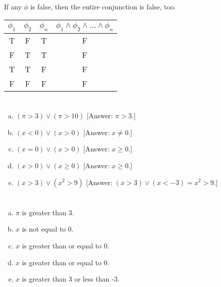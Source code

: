 \documentclass{article}
\begin{document}
\section{}

If any $\phi$ is false, then the entire conjunction is false, too.

\begin{tabular}{ | c | c | c | c | }
  \hline
  $\phi_1$ & $\phi_2$ & $\phi_n$ & $\phi_1 \wedge \phi_2 \wedge \dots \wedge \phi_n$ \\
  \hline
  T & F & T & F \\
  F & T & T & F \\
  T & T & F & F \\
  F & F & F & F \\
  \hline
\end{tabular}

\section{}

\begin{enumerate}[(a)]
\item $(\pi > 3) \vee (\pi > 10)$ [Answer: $\pi > 3$.]
\item $(x < 0) \vee (x > 0)$ [Answer: $x \neq 0$.]
\item $(x = 0) \vee (x > 0)$ [Answer: $x \geq 0$.]
\item $(x > 0) \vee (x \geq 0)$ [Answer: $x \geq 0$.]
\item $(x > 3) \vee (x^2 > 9)$ [Answer: $(x > 3) \vee (x < -3) = x^2 > 9$.]
\end{enumerate}

\section{}

\begin{enumerate}[(a)]
\item $\pi$ is greater than 3.
\item $x$ is not equal to 0.
\item $x$ is greater than or equal to 0.
\item $x$ is greater than or equal to 0.
\item $x$ is greater than 3 or less than -3.
\end{enumerate}

\section{}
\end{document}
